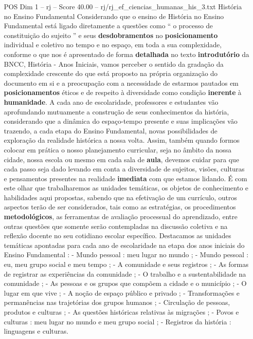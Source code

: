 \begin{textsample}{POS Dim 1 – rj – Score 40.00 – rj/rj\_ef\_ciencias\_humanas\_his\_3.txt}  \label{ex:f1_pos_272}
História no Ensino Fundamental Considerando que o ensino de História no Ensino Fundamental está ligado diretamente a questões como “ o processo de constituição do sujeito ” e seus \textbf{desdobramentos} no \textbf{posicionamento} individual e coletivo no tempo e no espaço, em toda a sua complexidade, conforme o que nos é apresentado de forma \textbf{detalhada} no texto \textbf{introdutório} da BNCC, História - Anos Iniciais, vamos perceber o sentido da gradação da complexidade crescente do que está proposto na própria organização do documento em si e a preocupação com a necessidade de estarmos pautados em \textbf{posicionamentos} éticos e de respeito à diversidade como condição \textbf{inerente} à \textbf{humanidade}.
A cada ano de escolaridade, professores e estudantes vão aprofundando mutuamente a construção de seus conhecimentos da história, considerando que a dinâmica do espaço-tempo presente e suas implicações vão trazendo, a cada etapa do Ensino Fundamental, novas possibilidades de exploração da realidade histórica a nossa volta.
Assim, também quando formos colocar em prática o nosso planejamento curricular, seja no âmbito da nossa cidade, nossa escola ou mesmo em cada sala de \textbf{aula}, devemos cuidar para que cada passo seja dado levando em conta a diversidade de sujeitos, visões, culturas e pensamentos presentes na realidade \textbf{imediata} com que estamos lidando.
É com este olhar que trabalharemos as unidades temáticas, os objetos de conhecimento e habilidades aqui propostas, sabendo que na efetivação de um currículo, outros aspectos terão de ser considerados, tais como as estratégias, os procedimentos \textbf{metodológicos}, as ferramentas de avaliação processual do aprendizado, entre outras questões que somente serão contempladas na discussão coletiva e na reflexão docente no seu cotidiano escolar específico.
Destacamos as unidades temáticas apontadas para cada ano de escolaridade na etapa dos anos iniciais do Ensino Fundamental : - Mundo pessoal : meu lugar no mundo ; - Mundo pessoal : eu, meu grupo social e meu tempo ; - A comunidade e seus registros ; - As formas de registrar as experiências da comunidade ; - O trabalho e a sustentabilidade na comunidade ; - As pessoas e os grupos que compõem a cidade e o município ; - O lugar em que vive ; - A noção de espaço público e privado ; - Transformações e permanências nas trajetórias dos grupos humanos ; - Circulação de pessoas, produtos e culturas ; - As questões históricas relativas às migrações ; - Povos e culturas : meu lugar no mundo e meu grupo social ; - Registros da história : linguagens e culturas.

\end{textsample}
